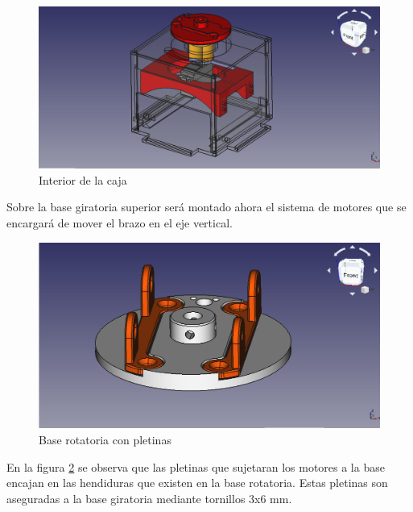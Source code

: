 \begin{figure}[H]
    \centering 
    \includegraphics[width=1\linewidth]{pictures/CajaConPiezasInternas.png}
    \caption{Interior de la caja}
    \label{fig:interior_caja_sujeccion}
\end{figure}

Sobre la base giratoria superior será montado ahora el sistema de motores que se encargará de mover el brazo en el eje vertical.

\begin{figure}[H]
    \centering 
    \includegraphics[width=1\linewidth]{pictures/BaseRotatoriaConPletinas.png}
    \caption{Base rotatoria con pletinas}
    \label{fig:base_rotatoria_pletinas}
\end{figure}

En la figura \ref{fig:base_rotatoria_pletinas} se observa que las pletinas que sujetaran los motores a la base encajan en las hendiduras que existen en la base rotatoria. Estas pletinas son aseguradas a la base giratoria mediante tornillos 3x6 mm.

